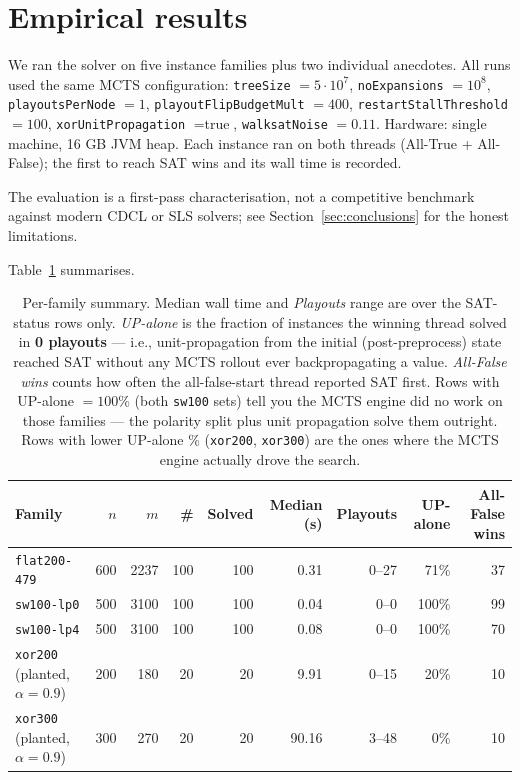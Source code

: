 \documentclass[11pt]{article}
\begin{document}
\section{Empirical results}
\label{sec:results}

We ran the solver on five instance families plus two individual
anecdotes. All runs used the same MCTS configuration:
\texttt{treeSize} $=5\cdot 10^7$, \texttt{noExpansions} $=10^8$,
\texttt{playoutsPerNode} $= 1$,
\texttt{playoutFlipBudgetMult} $= 400$,
\texttt{restartStallThreshold} $= 100$,
\texttt{xorUnitPropagation} $= \text{true}$,
\texttt{walksatNoise} $= 0.11$. Hardware: single machine, 16 GB JVM
heap. Each instance ran on both threads (All-True + All-False); the
first to reach SAT wins and its wall time is recorded.

\noindent The evaluation is a first-pass characterisation, not a
competitive benchmark against modern CDCL or SLS solvers; see
Section~\ref{sec:conclusions} for the honest limitations.

Table~\ref{tab:results} summarises.

\begin{table}[t]
\centering
\begin{tabular}{lrrrrrrrr}
\toprule
Family & $n$ & $m$ & \# & Solved
   & Median (s) & Playouts & UP-alone & All-False wins \\
\midrule
\texttt{flat200-479}    & 600  & 2237  & 100 & 100 & 0.31   & 0--27 & 71\% & 37 \\
\texttt{sw100-lp0}      & 500  & 3100  & 100 & 100 & 0.04   & 0--0  & 100\% & 99 \\
\texttt{sw100-lp4}      & 500  & 3100  & 100 & 100 & 0.08   & 0--0  & 100\% & 70 \\
\texttt{xor200} (planted, $\alpha{=}0.9$)
                        & 200  & 180   &  20 &  20 & 9.91   & 0--15 & 20\%  & 10 \\
\texttt{xor300} (planted, $\alpha{=}0.9$)
                        & 300  & 270   &  20 &  20 & 90.16  & 3--48 & 0\%   & 10 \\
\bottomrule
\end{tabular}
\caption{Per-family summary. Median wall time and \emph{Playouts}
range are over the SAT-status rows only. \emph{UP-alone} is the
fraction of instances the winning thread solved in \textbf{0
playouts} — i.e., unit-propagation from the initial (post-preprocess)
state reached SAT without any MCTS rollout ever backpropagating a
value. \emph{All-False wins} counts how often the all-false-start
thread reported SAT first. Rows with UP-alone $= 100\%$ (both
\texttt{sw100} sets) tell you the MCTS engine did no work on those
families — the polarity split plus unit propagation solve them
outright. Rows with lower UP-alone \% (\texttt{xor200},
\texttt{xor300}) are the ones where the MCTS engine actually
drove the search.}
\label{tab:results}
\end{table}
\end{document}
